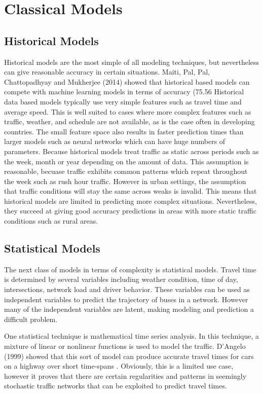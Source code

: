 \section{Classical Models}

\subsection{Historical Models}

Historical models are the most simple of all modeling techniques, but nevertheless can give reasonable accuracy in certain situations.
Maiti, Pal, Pal, Chattopadhyay and Mukherjee (2014) showed that historical based models can compete with machine learning models in terms of accuracy (75.56%
Historical data based models typically use very simple features such as travel time and average speed.
This is well suited to cases where more complex features such as traffic, weather, and schedule are not available, as is the case often in developing countries.
The small feature space also results in faster prediction times than larger models such as neural networks which can have huge numbers of parameters.
Because historical models treat traffic as static across periods such as the week, month or year depending on the amount of data.
This assumption is reasonable, becuase traffic exhibits common patterns which repeat throughout the week such as rush hour traffic.
However in urban settings, the assumption that traffic conditions will stay the same across weaks is invalid.
This means that historical models are limited in predicting more complex situations.
Nevertheless, they succeed at giving good accuracy predictions in areas with more static traffic conditions such as rural areas.


\subsection{Statistical Models}

The next class of models in terms of complexity is statistical models.
Travel time is determined by several variables including weather condition, time of day, intersections, network load and driver behavior.
These variables can be used as independent variables to predict the trajectory of buses in a network.
However many of the independent variables are latent, making modeling and prediction a difficult problem.

One statistical technique is mathematical time series analysis.
In this technique, a mixture of linear or nonlinear functions is used to model the traffic.
D'Angelo (1999) showed that this sort of model can produce accurate travel times for cars on a highway over short time-spans \cite{d1999travel}.
Obviously, this is a limited use case, however it proves that there are certain regularities and patterns in seemingly stochastic traffic networks that can be exploited to predict travel times.

